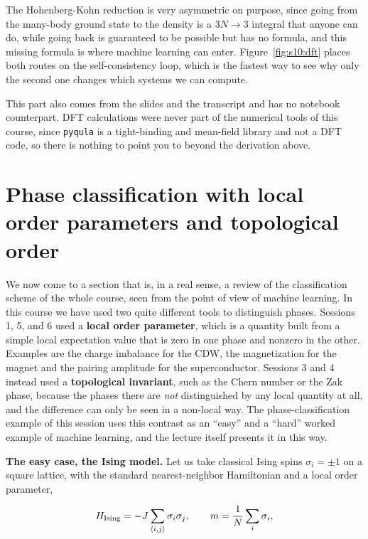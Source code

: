 The Hohenberg-Kohn reduction is very asymmetric on purpose, since going from the many-body ground
state to the density is a $3N\to3$ integral that anyone can do, while going back is guaranteed to
be possible but has no formula, and this missing formula is where machine learning can enter.
Figure~\ref{fig:s10:dft} places both routes on the self-consistency loop, which is the fastest way
to see why only the second one changes which systems we can compute.



This part also comes from the slides and the transcript and has no notebook counterpart. DFT
calculations were never part of the numerical tools of this course, since \texttt{pyqula} is a
tight-binding and mean-field library and not a DFT code, so there is nothing to point you to beyond
the derivation above.

\section{Phase classification with local order parameters and topological order}

We now come to a section that is, in a real sense, a review of the classification scheme of the
whole course, seen from the point of view of machine learning. In this course we have used two
quite different tools to distinguish phases. Sessions 1, 5, and 6 used a \textbf{local order
parameter}, which is a quantity built from a simple local expectation value that is zero in one
phase and nonzero in the other. Examples are the charge imbalance for the CDW, the magnetization for
the magnet and the pairing amplitude for the superconductor. Sessions 3 and 4 instead used a
\textbf{topological invariant}, such as the Chern number or the Zak phase, because the phases there
are \emph{not} distinguished by any local quantity at all, and the difference can only be seen in
a non-local way. The phase-classification example of this session uses this contrast as an
``easy'' and a ``hard'' worked example of machine learning, and the lecture itself presents it in
this way.

\textbf{The easy case, the Ising model.} Let us take classical Ising spins $\sigma_i = \pm 1$ on a
square lattice, with the standard nearest-neighbor Hamiltonian and a local order parameter,

\begin{equation}
H_{\rm Ising} = -J\sum_{\langle i,j\rangle} \sigma_i \sigma_j, \qquad m = \frac{1}{N}\sum_i \sigma_i,
\end{equation}

